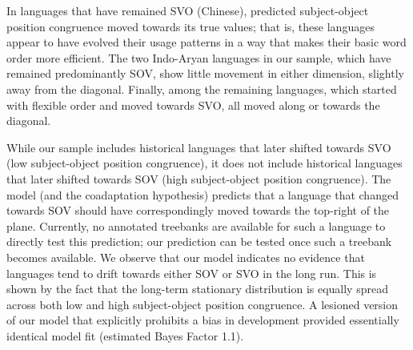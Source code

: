 \documentclass[11pt,a4paper]{article}
\newcommand\comment[1]{{\color{red}#1}}
\newcommand\mhahn[1]{{\color{red}(#1)}}
\begin{document}
In languages that have remained SVO (Chinese), predicted subject-object position congruence moved towards its true values; that is, these languages appear to have evolved their usage patterns in a way that makes their basic word order more efficient.
The two Indo-Aryan languages in our sample, which have remained predominantly SOV, show little movement in either dimension, slightly away from the diagonal.
Finally, among the remaining languages, which started with flexible order and moved towards SVO, all moved along or towards the diagonal.



While our sample includes historical languages that later shifted towards SVO (low subject-object position congruence), it does not include historical languages that later shifted towards SOV (high subject-object position congruence).
The model (and the coadaptation hypothesis) predicts that a language that changed towards SOV should have correspondingly moved towards the top-right of the plane. 
Currently, no annotated treebanks are available for such a language to directly test this prediction; our prediction can be tested once such a treebank becomes available.
We observe that our model indicates no evidence that languages tend to drift towards either SOV or SVO in the long run.
This is shown by the fact that the long-term stationary distribution is equally spread across both low and high subject-object position congruence.
A lesioned version of our model that explicitly prohibits a bias in development provided essentially identical model fit (estimated Bayes Factor 1.1).
\end{document}
